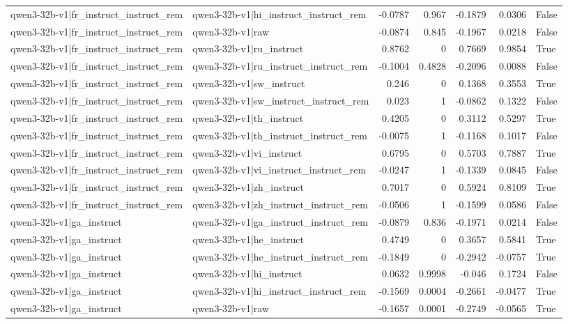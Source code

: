 \begin{table}
\begin{tabular}{l l r r r r l}
qwen3-32b-v1|fr_instruct_instruct_rem & qwen3-32b-v1|hi_instruct_instruct_rem & -0.0787 & 0.967 & -0.1879 & 0.0306 & False \\
qwen3-32b-v1|fr_instruct_instruct_rem & qwen3-32b-v1|raw & -0.0874 & 0.845 & -0.1967 & 0.0218 & False \\
qwen3-32b-v1|fr_instruct_instruct_rem & qwen3-32b-v1|ru_instruct & 0.8762 & 0 & 0.7669 & 0.9854 & True \\
qwen3-32b-v1|fr_instruct_instruct_rem & qwen3-32b-v1|ru_instruct_instruct_rem & -0.1004 & 0.4828 & -0.2096 & 0.0088 & False \\
qwen3-32b-v1|fr_instruct_instruct_rem & qwen3-32b-v1|sw_instruct & 0.246 & 0 & 0.1368 & 0.3553 & True \\
qwen3-32b-v1|fr_instruct_instruct_rem & qwen3-32b-v1|sw_instruct_instruct_rem & 0.023 & 1 & -0.0862 & 0.1322 & False \\
qwen3-32b-v1|fr_instruct_instruct_rem & qwen3-32b-v1|th_instruct & 0.4205 & 0 & 0.3112 & 0.5297 & True \\
qwen3-32b-v1|fr_instruct_instruct_rem & qwen3-32b-v1|th_instruct_instruct_rem & -0.0075 & 1 & -0.1168 & 0.1017 & False \\
qwen3-32b-v1|fr_instruct_instruct_rem & qwen3-32b-v1|vi_instruct & 0.6795 & 0 & 0.5703 & 0.7887 & True \\
qwen3-32b-v1|fr_instruct_instruct_rem & qwen3-32b-v1|vi_instruct_instruct_rem & -0.0247 & 1 & -0.1339 & 0.0845 & False \\
qwen3-32b-v1|fr_instruct_instruct_rem & qwen3-32b-v1|zh_instruct & 0.7017 & 0 & 0.5924 & 0.8109 & True \\
qwen3-32b-v1|fr_instruct_instruct_rem & qwen3-32b-v1|zh_instruct_instruct_rem & -0.0506 & 1 & -0.1599 & 0.0586 & False \\
qwen3-32b-v1|ga_instruct & qwen3-32b-v1|ga_instruct_instruct_rem & -0.0879 & 0.836 & -0.1971 & 0.0214 & False \\
qwen3-32b-v1|ga_instruct & qwen3-32b-v1|he_instruct & 0.4749 & 0 & 0.3657 & 0.5841 & True \\
qwen3-32b-v1|ga_instruct & qwen3-32b-v1|he_instruct_instruct_rem & -0.1849 & 0 & -0.2942 & -0.0757 & True \\
qwen3-32b-v1|ga_instruct & qwen3-32b-v1|hi_instruct & 0.0632 & 0.9998 & -0.046 & 0.1724 & False \\
qwen3-32b-v1|ga_instruct & qwen3-32b-v1|hi_instruct_instruct_rem & -0.1569 & 0.0004 & -0.2661 & -0.0477 & True \\
qwen3-32b-v1|ga_instruct & qwen3-32b-v1|raw & -0.1657 & 0.0001 & -0.2749 & -0.0565 & True \\

\end{tabular}
\end{table}
